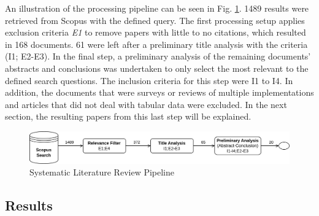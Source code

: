 An illustration of the processing pipeline can be seen in Fig. \ref{fig:slr_pipeline}. 1489 results were retrieved from Scopus with the defined query. The first processing setup applies exclusion criteria \textit{E1} to remove papers with little to no citations, which resulted in 168 documents. 61 were left after a preliminary title analysis with the criteria (I1; E2-E3). In the final step, a preliminary analysis of the remaining documents' abstracts and conclusions was undertaken to only select the most relevant to the defined search questions. The inclusion criteria for this step were I1 to I4. In addition, the documents that were surveys or reviews of multiple implementations and articles that did not deal with tabular data were excluded. In the next section, the resulting papers from this last step will be explained.

\begin{figure}[htp]
\centering
\includegraphics[width=\textwidth]{figures/slr_pipeline.png}
\caption{Systematic Literature Review Pipeline}
\label{fig:slr_pipeline}
\end{figure}




\subsection{Results}\label{sec:gan_sota_results}

